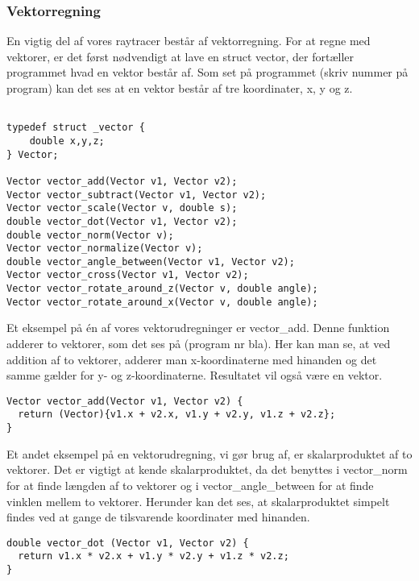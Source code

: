 \subsubsection{Vektorregning}
En vigtig del af vores raytracer består af vektorregning. For at regne med vektorer, er det først nødvendigt at lave en struct vector, der fortæller programmet hvad en vektor består af. Som set på programmet (skriv nummer på program) kan det ses at en vektor består af tre koordinater, x, y og z. 

\begin{lstlisting}[style=Cstyle, caption=Vektorprototyper og struct]

typedef struct _vector {
    double x,y,z;
} Vector;

Vector vector_add(Vector v1, Vector v2);
Vector vector_subtract(Vector v1, Vector v2);
Vector vector_scale(Vector v, double s);
double vector_dot(Vector v1, Vector v2);
double vector_norm(Vector v);
Vector vector_normalize(Vector v);
double vector_angle_between(Vector v1, Vector v2);
Vector vector_cross(Vector v1, Vector v2);
Vector vector_rotate_around_z(Vector v, double angle);
Vector vector_rotate_around_x(Vector v, double angle);

\end{lstlisting}

Et eksempel på én af vores vektorudregninger er vector\_add. Denne funktion adderer to vektorer, som det ses på (program nr bla). Her kan man se, at ved addition af to vektorer, adderer man x-koordinaterne med hinanden og det samme gælder for y- og z-koordinaterne. Resultatet vil også være en vektor.

\begin{lstlisting}[style=Cstyle, caption=vector add]
Vector vector_add(Vector v1, Vector v2) {
  return (Vector){v1.x + v2.x, v1.y + v2.y, v1.z + v2.z};
}

\end{lstlisting}

Et andet eksempel på en vektorudregning, vi gør brug af, er skalarproduktet af to vektorer. Det er vigtigt at kende skalarproduktet, da det benyttes i vector\_norm for at finde længden af to vektorer og i vector\_angle\_between for at finde vinklen mellem to vektorer. Herunder kan det ses, at skalarproduktet simpelt findes ved at gange de tilsvarende koordinater med hinanden.

\begin{lstlisting}[style=Cstyle, caption=vector dot]
double vector_dot (Vector v1, Vector v2) {
  return v1.x * v2.x + v1.y * v2.y + v1.z * v2.z;
}
\end{lstlisting}


